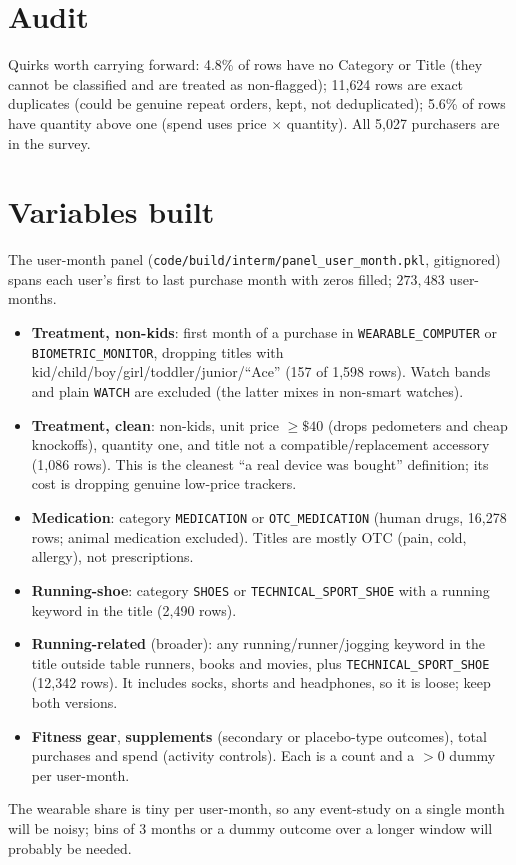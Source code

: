\documentclass[11pt]{article}
\begin{document}
\section{Audit}
\begin{center}\small\end{center}
Quirks worth carrying forward: 4.8\% of rows have no Category or Title (they cannot be classified and are treated as non-flagged); 11{,}624 rows are exact duplicates (could be genuine repeat orders, kept, not deduplicated); 5.6\% of rows have quantity above one (spend uses price $\times$ quantity). All 5{,}027 purchasers are in the survey.

\section{Variables built}
The user-month panel (\texttt{code/build/interm/panel\_user\_month.pkl}, gitignored) spans each user's first to last purchase month with zeros filled; $273{,}483$ user-months.
\begin{itemize}[nosep]
\item \textbf{Treatment, non-kids}: first month of a purchase in \texttt{WEARABLE\_COMPUTER} or \texttt{BIOMETRIC\_MONITOR}, dropping titles with kid/child/boy/girl/toddler/junior/``Ace'' (157 of 1{,}598 rows). Watch bands and plain \texttt{WATCH} are excluded (the latter mixes in non-smart watches).
\item \textbf{Treatment, clean}: non-kids, unit price $\geq\$40$ (drops pedometers and cheap knockoffs), quantity one, and title not a compatible/replacement accessory (1{,}086 rows). This is the cleanest ``a real device was bought'' definition; its cost is dropping genuine low-price trackers.
\item \textbf{Medication}: category \texttt{MEDICATION} or \texttt{OTC\_MEDICATION} (human drugs, 16{,}278 rows; animal medication excluded). Titles are mostly OTC (pain, cold, allergy), not prescriptions.
\item \textbf{Running-shoe}: category \texttt{SHOES} or \texttt{TECHNICAL\_SPORT\_SHOE} with a running keyword in the title (2{,}490 rows).
\item \textbf{Running-related} (broader): any running/runner/jogging keyword in the title outside table runners, books and movies, plus \texttt{TECHNICAL\_SPORT\_SHOE} (12{,}342 rows). It includes socks, shorts and headphones, so it is loose; keep both versions.
\item \textbf{Fitness gear}, \textbf{supplements} (secondary or placebo-type outcomes), total purchases and spend (activity controls). Each is a count and a $>0$ dummy per user-month.
\end{itemize}
\begin{center}\small\quad\end{center}
The wearable share is tiny per user-month, so any event-study on a single month will be noisy; bins of 3 months or a dummy outcome over a longer window will probably be needed.
\end{document}
